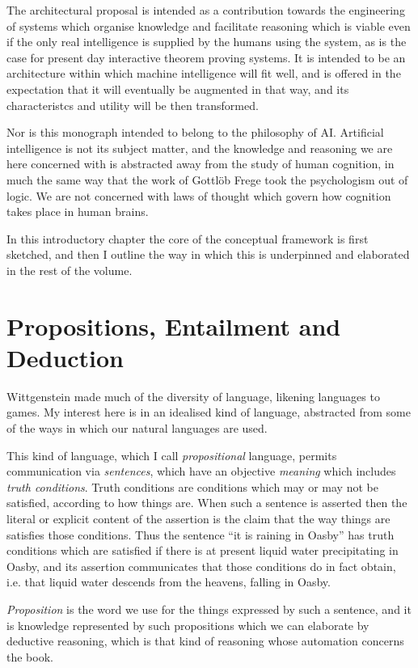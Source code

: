 The architectural proposal is intended as a contribution towards the engineering of systems which organise knowledge and facilitate reasoning which is viable even if the only real intelligence is supplied by the humans using the system, as is the case for present day interactive theorem proving systems.
It is intended to be an architecture within which machine intelligence will fit well, and is offered in the expectation that it will eventually be augmented in that way, and its characteristcs and utility will be then transformed.

Nor is this monograph intended to belong to the philosophy of AI.
Artificial intelligence is not its subject matter, and the knowledge and reasoning we are here concerned with is abstracted away from the study of human cognition, in much the same way that the work of Gottl{\"o}b Frege took the psychologism out of logic.
We are not concerned with laws of thought which govern how cognition takes place in human brains.

In this introductory chapter the core of the conceptual framework is first sketched, and then I outline the way in which this is underpinned and elaborated in the rest of the volume.

\section{Propositions, Entailment and Deduction}

Wittgenstein made much of the diversity of language, likening languages to games.
My interest here is in an idealised kind of language, abstracted from some of the ways in which our natural languages are used.

This kind of language, which I call {\it propositional} language, permits communication via {\it sentences}, which have an objective {\it meaning} which includes {\it truth conditions}.
Truth conditions are conditions which may or may not be satisfied, according to how things are.
When such a sentence is asserted then the literal or explicit content of the assertion is the claim that the way things are satisfies those conditions.
Thus the sentence ``it is raining in Oasby'' has truth conditions which are satisfied if there is at present liquid water precipitating in Oasby, and its assertion communicates that those conditions do in fact obtain, i.e. that liquid water descends from the heavens, falling in Oasby.

{\it Proposition} is the word we use for the things expressed by such a sentence, and it is knowledge represented by such propositions which we can elaborate by deductive reasoning, which is that kind of reasoning whose automation concerns the book.




